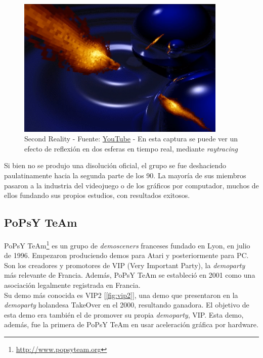 \begin{figure}[h]
	\centering
	\includegraphics[width=10cm]{archivos/second-reality}
	\caption{Second Reality - Fuente: \href{https://www.youtube.com/watch?v=XezcZVu66QI}{YouTube} - En esta captura se puede ver un efecto de reflexión en dos esferas en tiempo real, mediante \emph{raytracing}}
	\label{fig:secondreality}
\end{figure}

Si bien no se produjo una disolución oficial, el grupo se fue deshaciendo paulatinamente hacia la segunda parte de los 90. La mayoría de sus miembros pasaron a la industria del videojuego o de los gráficos por computador, muchos de ellos fundando sus propios estudios, con resultados exitosos.

\subsection{PoPsY TeAm}

PoPsY TeAm\footnote{\url{http://www.popsyteam.org}} es un grupo de \emph{demosceners} franceses fundado en Lyon, en julio de 1996. Empezaron produciendo demos para Atari y posteriormente para PC.\\

Son los creadores y promotores de VIP (Very Important Party), la \emph{demoparty} más relevante de Francia. Además, PoPsY TeAm se estableció en 2001 como una asociación legalmente registrada en Francia.\\

Su demo más conocida es VIP2 [\ref{fig:vip2}], una demo que presentaron en la \emph{demoparty} holandesa TakeOver en el 2000, resultando ganadora. El objetivo de esta demo era también el de promover su propia \emph{demoparty}, VIP. Esta demo, además, fue la primera de PoPsY TeAm en usar aceleración gráfica por hardware.\\

